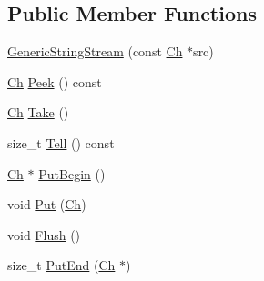 \subsection*{Public Member Functions}
\begin{DoxyCompactItemize}
\item 
\mbox{\hyperlink{structrapidjson_1_1_generic_string_stream_ab160d646f4560d7b95f3fd816c3aac9a}{Generic\+String\+Stream}} (const \mbox{\hyperlink{structrapidjson_1_1_generic_string_stream_a70ad06c96ddf8349be59f3d4f6bbadc8}{Ch}} $\ast$src)
\item 
\mbox{\hyperlink{structrapidjson_1_1_generic_string_stream_a70ad06c96ddf8349be59f3d4f6bbadc8}{Ch}} \mbox{\hyperlink{structrapidjson_1_1_generic_string_stream_aa941b18ff3849494ca3692a8688500da}{Peek}} () const
\item 
\mbox{\hyperlink{structrapidjson_1_1_generic_string_stream_a70ad06c96ddf8349be59f3d4f6bbadc8}{Ch}} \mbox{\hyperlink{structrapidjson_1_1_generic_string_stream_a56bb2351836bace23555f4dc5abf57b1}{Take}} ()
\item 
size\+\_\+t \mbox{\hyperlink{structrapidjson_1_1_generic_string_stream_a7b0cfaa0a08c80fa30140ba5679001c0}{Tell}} () const
\item 
\mbox{\hyperlink{structrapidjson_1_1_generic_string_stream_a70ad06c96ddf8349be59f3d4f6bbadc8}{Ch}} $\ast$ \mbox{\hyperlink{structrapidjson_1_1_generic_string_stream_aca059ce7c89211420513940db8a52668}{Put\+Begin}} ()
\item 
void \mbox{\hyperlink{structrapidjson_1_1_generic_string_stream_a9a515c0ba83ad9029d1560952584cd2e}{Put}} (\mbox{\hyperlink{structrapidjson_1_1_generic_string_stream_a70ad06c96ddf8349be59f3d4f6bbadc8}{Ch}})
\item 
void \mbox{\hyperlink{structrapidjson_1_1_generic_string_stream_a5c7a3e097eb461b9cec5976576ecb9e4}{Flush}} ()
\item 
size\+\_\+t \mbox{\hyperlink{structrapidjson_1_1_generic_string_stream_a105adc6eec3483f90f6f2cf57aa81c12}{Put\+End}} (\mbox{\hyperlink{structrapidjson_1_1_generic_string_stream_a70ad06c96ddf8349be59f3d4f6bbadc8}{Ch}} $\ast$)
\end{DoxyCompactItemize}
